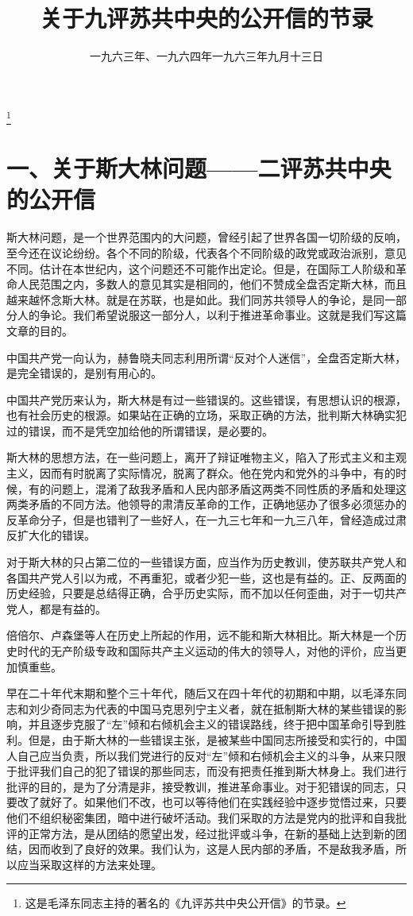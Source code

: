 
\title{关于九评苏共中央的公开信的节录}
\date{一九六三年、一九六四年}
\thanks{这是毛泽东同志主持的著名的《九评苏共中央公开信》的节录。}
\maketitle


\date{一九六三年九月十三日}
\section{一、关于斯大林问题——二评苏共中央的公开信}

斯大林问题，是一个世界范围内的大问题，曾经引起了世界各国一切阶级的反响，至今还在议论纷纷。各个不同的阶级，代表各个不同阶级的政党或政治派别，意见不同。估计在本世纪内，这个问题还不可能作出定论。但是，在国际工人阶级和革命人民范围之内，多数人的意见其实是相同的，他们不赞成全盘否定斯大林，而且越来越怀念斯大林。就是在苏联，也是如此。我们同苏共领导人的争论，是同一部分人的争论。我们希望说服这一部分人，以利于推进革命事业。这就是我们写这篇文章的目的。

中国共产党一向认为，赫鲁晓夫同志利用所谓“反对个人迷信”，全盘否定斯大林，是完全错误的，是别有用心的。

中国共产党历来认为，斯大林是有过一些错误的。这些错误，有思想认识的根源，也有社会历史的根源。如果站在正确的立场，采取正确的方法，批判斯大林确实犯过的错误，而不是凭空加给他的所谓错误，是必要的。

斯大林的思想方法，在一些问题上，离开了辩证唯物主义，陷入了形式主义和主观主义，因而有时脱离了实际情况，脱离了群众。他在党内和党外的斗争中，有的时候，有的问题上，混淆了敌我矛盾和人民内部矛盾这两类不同性质的矛盾和处理这两类矛盾的不同方法。他领导的肃清反革命的工作，正确地惩办了很多必须惩办的反革命分子，但是也错判了一些好人，在一九三七年和一九三八年，曾经造成过肃反扩大化的错误。

对于斯大林的只占第二位的一些错误方面，应当作为历史教训，使苏联共产党人和各国共产党人引以为戒，不再重犯，或者少犯一些，这也是有益的。正、反两面的历史经验，只要是总结得正确，合乎历史实际，而不加以任何歪曲，对于一切共产党人，都是有益的。

倍倍尔、卢森堡等人在历史上所起的作用，远不能和斯大林相比。斯大林是一个历史时代的无产阶级专政和国际共产主义运动的伟大的领导人，对他的评价，应当更加慎重些。

早在二十年代末期和整个三十年代，随后又在四十年代的初期和中期，以毛泽东同志和刘少奇同志为代表的中国马克思列宁主义者，就在抵制斯大林的某些错误的影响，并且逐步克服了“左”倾和右倾机会主义的错误路线，终于把中国革命引导到胜利。但是，由于斯大林的一些错误主张，是被某些中国同志所接受和实行的，中国人自己应当负责，所以我们党进行的反对“左”倾和右倾机会主义的斗争，从来只限于批评我们自己的犯了错误的那些同志，而没有把责任推到斯大林身上。我们进行批评的目的，是为了分清是非，接受教训，推进革命事业。对于犯错误的同志，只要改了就好了。如果他们不改，也可以等待他们在实践经验中逐步觉悟过来，只要他们不组织秘密集团，暗中进行破坏活动。我们采取的方法是党内的批评和自我批评的正常方法，是从团结的愿望出发，经过批评或斗争，在新的基础上达到新的团结，因而收到了良好的效果。我们认为，这是人民内部的矛盾，不是敌我矛盾，所以应当采取这样的方法来处理。

